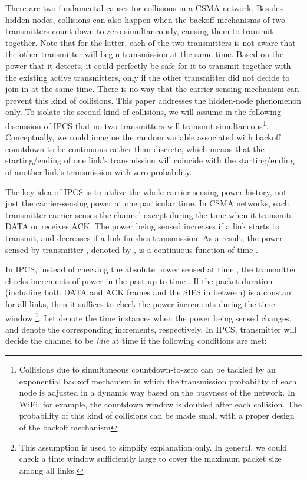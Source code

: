 \documentclass[conference]{IEEEtran}
\begin{document}
There are two fundamental causes for collisions in a CSMA network.
Besides hidden nodes, collisions can also happen when the backoff
mechanisms of two transmitters count down to zero simultaneously,
causing them to transmit together. Note that for the latter, each of
the two transmitters is not aware that the other transmitter will
begin transmission at the same time. Based on the power that it
detects, it could perfectly be safe for it to transmit together with
the existing active transmitters, only if the other transmitter did
not decide to join in at the same time. There is no way that the
carrier-sensing mechanism can prevent this kind of collisions. This
paper addresses the hidden-node phenomenon only. To isolate the
second kind of collisions, we will assume in the following
discussion of IPCS that no two transmitters will transmit
simultaneous\footnote[3]{Collisions due to simultaneous
countdown-to-zero can be tackled by an exponential backoff mechanism
in which the transmission probability of each node is adjusted in a
dynamic way based on the busyness of the network. In WiFi, for
example, the countdown window is doubled after each collision. The
probability of this kind of collisions can be made small with a
proper design of the backoff mechanism}. Conceptually, we could
imagine the random variable associated with backoff countdown to be
continuous rather than discrete, which means that the
starting/ending of one link's transmission will coincide with the
starting/ending of another link's transmission with zero
probability.






The key idea of IPCS is to utilize the whole carrier-sensing power
history, not just the carrier-sensing power at one particular time.
In CSMA networks, each transmitter  carrier senses the channel
except during the time when it transmits DATA or receives ACK. The
power being sensed increases if a link starts to transmit, and
decreases if a link f\/inishes transmission. As a result, the power
sensed by transmitter , denoted by , is a
continuous function of time .

In IPCS, instead of checking the absolute power sensed at time ,
the transmitter checks increments of power in the past up to time
. If the packet duration  (including both DATA and
ACK frames and the SIFS in between) is a constant for all links,
then it suff\/ices to check the power increments during the time
window \footnote[4]{This assumption is used to
simplify explanation only. In general, we could check a time window
suff\/iciently large to cover the maximum packet size among all
links.}. Let  denote the time
instances when the power being sensed changes, and  denote the corresponding increments,
respectively. In IPCS, transmitter  will decide the channel to
be \emph{idle} at time  if the following conditions are met:
\end{document}
